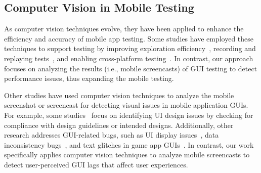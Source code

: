 
\subsection{Computer Vision in Mobile Testing}
As computer vision techniques evolve, they have been applied to enhance the efficiency and accuracy of mobile app testing. Some studies have employed these techniques to support testing by improving exploration efficiency~\cite{2023_ICSE_Efficiency_Matters_Speeding_Up_Automated_Testing_with_GUI_Rendering_Inference}, recording and replaying tests~\cite{2020_ICSE_translating_video_recordings_of_mobile_app_usages, 2023_UIST_Video2Action}, and enabling cross-platform testing~\cite{2024_TOSEM_PIRLTEST_GUI_Testing_via_Image_Embedding_and_RL, 2021_ICSE_Layout_and_Image_Recognition_Driving_Mobile_Testing}. In contrast, our approach focuses on analyzing the results (i.e., mobile screencasts) of GUI testing to detect performance issues, thus expanding the mobile testing.

Other studies have used computer vision techniques to analyze the mobile screenshot or screencast for detecting visual issues in mobile application GUIs. For example, some studies~\cite{2018_ICSE_Automated_reporting_of_GUI_design_violations, 2020_ICSE_Seenomaly_vision_based_linting_of_GUI_animation_effects_against_guidelines, 2021_ICSE_Hunting_Down_Visual_Design_Smells_in_Complex_UIs, 2024_ICSE_MotorEase} focus on identifying UI design issues by checking for compliance with design guidelines or intended designs. Additionally, other research addresses GUI-related bugs, such as UI display issues~\cite{2021_ASE_spotting_UI_display_issues}, data inconsistency bugs~\cite{2024_ICSE_Data_Inconsistency_Detection_of_Mobile_Apps}, and text glitches in game app GUIs~\cite{2023_FSE_Automated_Game_GUI_Text_Glitch_Detection}. In contrast, our work specifically applies computer vision techniques to analyze mobile screencasts to detect user-perceived GUI lags that affect user experiences.  

